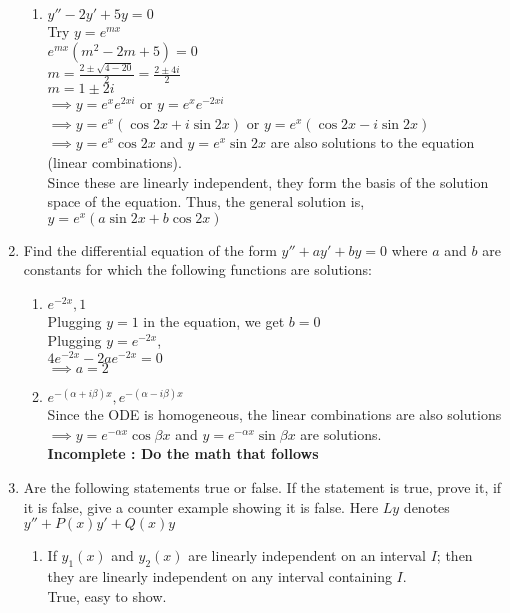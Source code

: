 \documentclass[a4paper]{article}
\begin{document}
\begin{enumerate}
\begin{enumerate}
		\item $y''-2y'+5y=0$
			\\Try $y=e^{mx}$
			\\$e^{mx}(m^2-2m+5)=0$
			\\$m=\frac{2\pm\sqrt{4-20}}{2}=\frac{2\pm 4i}{2}$
			\\$m=1\pm 2i$
			\\$\implies y=e^xe^{2xi}$ or $y=e^xe^{-2xi}$
			\\$\implies y=e^x(\cos 2x + i\sin 2x)$ or $y=e^x(\cos 2x - i\sin 2x)$
			\\$\implies y=e^x\cos 2x$ and $y=e^x\sin 2x$ are also solutions to the equation (linear combinations).
			\\Since these are linearly independent, they form the basis of the solution space of the equation. Thus, the general solution is,
			\\$y=e^x(a\sin 2x + b\cos 2x)$
	\end{enumerate}
		
	\item Find the differential equation of the form $y''+ay'+by=0$ where $a$ and $b$ are constants for which the following functions are solutions:
	\begin{enumerate}
		\item $e^{-2x}, 1$
			\\Plugging $y=1$ in the equation, we get $b=0$
			\\Plugging $y=e^{-2x}$,
			\\$4e^{-2x}-2ae^{-2x}=0$
			\\$\implies a=2$
		\item $e^{-(\alpha+i\beta)x}, e^{-(\alpha-i\beta)x}$
			\\Since the ODE is homogeneous, the linear combinations are also solutions
			\\$\implies y=e^{-\alpha x}\cos{\beta x}$ and $y=e^{-\alpha x}\sin{\beta x}$ are solutions.
			\\\textbf{Incomplete : Do the math that follows}
	\end{enumerate}
	
	\item Are the following statements true or false. If the statement is true, prove it, if it is false, give a counter example showing it is false. Here $Ly$ denotes $y''+P(x)y'+Q(x)y$
	\begin{enumerate}
		\item If $y_1(x)$ and $y_2(x)$ are linearly independent on an interval $I$; then they are linearly independent on any interval containing $I$.
		\\True, easy to show.
		

\end{enumerate}
\end{enumerate}
\end{document}
